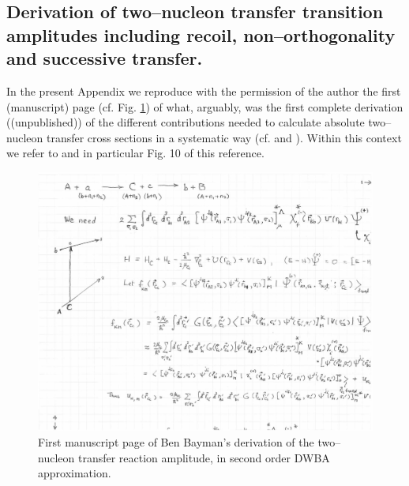 \begin{subappendices}
\section[Bayman's two--nucleon transfer amplitudes]{Derivation of two--nucleon transfer transition amplitudes including recoil, non--orthogonality and successive transfer.}\label{C7AppO}
In the present Appendix we reproduce with the permission of the author the first (manuscript) page (cf. Fig. \ref{fig5.h.1}) of what, arguably, was the first complete derivation (\cite{Bayman:70}(unpublished)) of the different contributions needed to calculate absolute two--nucleon transfer cross sections in a systematic way (cf. \cite{Bayman:71} and \cite{Bayman:82}). Within this context we refer to \cite{Broglia:73} and \cite{Potel:13} in particular Fig. 10 of this reference. 
\begin{figure}
\centerline{\includegraphics*[width=17cm,angle=0]{C7/figs_C7/fig5_H_1.pdf}}
\caption{First manuscript page of Ben Bayman's derivation of the two--nucleon transfer reaction amplitude, in second order DWBA approximation.}\label{fig5.h.1}
\end{figure}
\end{subappendices}


%
 